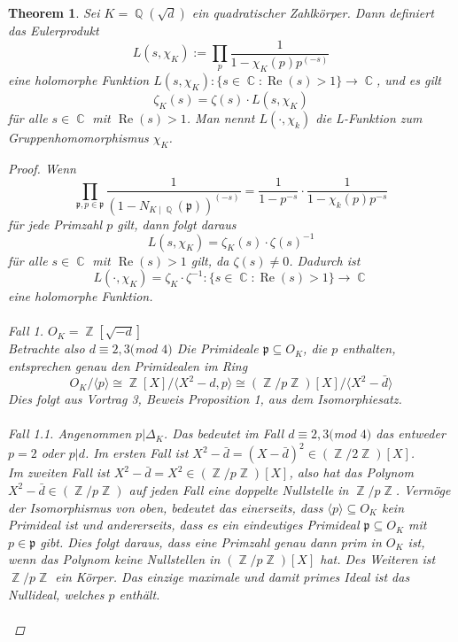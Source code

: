 \documentclass[10pt,a4paper]{article}
\theoremstyle{plain}
\newtheorem{thm}{Theorem}[section]
\theoremstyle{definition}
\theoremstyle{remark}
\DeclareMathOperator{\C}{\mathbb{C}}
\DeclareMathOperator{\Q}{\mathbb{Q}}
\DeclareMathOperator{\Z}{\mathbb{Z}}
\DeclareMathOperator{\re}{Re}
\begin{document}
\begin{thm}

Sei $K=\Q(\sqrt{d})$ ein quadratischer Zahlkörper. Dann definiert das Eulerprodukt $$L(s,\chi_K) := \prod_{p}\frac{1}{1-\chi_K(p)p^{(-s)}} $$ eine holomorphe Funktion $L(s,\chi_K) \colon \{s \in \C \colon \re(s) > 1\} \rightarrow \C$, und es gilt $$\zeta_K(s) = \zeta(s)\cdot L(s,\chi_K) $$ für alle $s \in \C $ mit $ \re(s) > 1$. Man nennt $L(\cdot,\chi_k)$ die L-Funktion zum Gruppenhomomorphismus $\chi_K$.

\begin{proof}

Wenn $$\prod_{\mathfrak{p},p \in \mathfrak{p}}\frac{1}{(1- N_{K\mid \Q}(\mathfrak{p}))^{(-s)}}= \frac{1}{1-p^{-s}}\cdot\frac{1}{1-\chi_k(p)p^{-s}}$$ für jede Primzahl $p$ gilt, dann folgt daraus $$L(s,\chi_K)= \zeta_K(s)\cdot \zeta(s)^{-1}$$ für alle $s \in \C $ mit $ \re(s)>1$ gilt, da $\zeta(s) \neq 0$. Dadurch ist $$L(\cdot,\chi_K)= \zeta_K\cdot \zeta^{-1}\colon \{s \in \C \colon \re(s)>1\}\rightarrow \C$$ eine holomorphe Funktion.
\\
\\
\textit{Fall 1.}
$O_K= \Z[\sqrt{-d}]$ \\
Betrachte also $d\equiv2,3 ($mod $ 4)$
Die Primideale $\mathfrak{p} \subseteq O_K$, die $p$ enthalten, entsprechen genau den Primidealen im Ring $$O_K /\langle p\rangle \cong \Z[X] /\langle X^2-d,p\rangle \cong (\Z/p\Z)[X]/\langle X^2-\bar{d}\rangle$$  Dies folgt aus Vortrag 3, Beweis Proposition 1, aus dem Isomorphiesatz.
\\
\\
\textit{Fall 1.1.}
Angenommen $p | \Delta_K$. Das bedeutet im Fall $d \equiv2,3 ($mod $ 4)$ das entweder $p = 2$ oder $p|d$. Im ersten Fall ist $X^2-\bar{d} = (X-\bar{d})^2 \in (\Z/2\Z)[X]$.
\\
Im zweiten Fall ist $X^2-\bar{d} = X^2 \in (\Z/p\Z)[X]$, also hat das Polynom $X^2-\bar{d} \in (\Z/p\Z)$ auf jeden Fall eine doppelte Nullstelle in $\Z/p\Z$. Vermöge der Isomorphismus von oben, bedeutet das einerseits, dass $\langle p\rangle \subseteq O_K$ kein Primideal ist und andererseits, dass es ein eindeutiges Primideal $\mathfrak{p} \subseteq O_K$ mit $p \in \mathfrak{p}$ gibt. Dies folgt daraus, dass eine Primzahl genau dann prim in $O_K$  ist, wenn das Polynom keine Nullstellen in $(\Z/p\Z)[X]$ hat. Des Weiteren ist $\Z/p\Z$ ein Körper. Das einzige maximale und damit primes Ideal ist das Nullideal, welches $p$ enthält.
\\
\\

\end{proof}
\end{thm}
\end{document}
